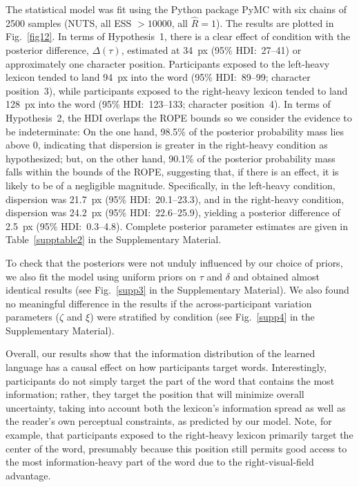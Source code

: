 \documentclass[doc,biblatex,floatsintext]{apa7}
\begin{document}
The statistical model was fit using the Python package PyMC with six chains of 2500 samples (NUTS, all ESS $> 10000$, all $\hat{R}=1$). The results are plotted in Fig.~\ref{fig12}. In terms of Hypothesis~1, there is a clear effect of condition with the posterior difference, $\Delta(\tau)$, estimated at 34~px (95\% HDI:~27--41) or approximately one character position. Participants exposed to the left-heavy lexicon tended to land 94~px into the word (95\% HDI:~89--99; character position~3), while participants exposed to the right-heavy lexicon tended to land 128~px into the word (95\% HDI:~123--133; character position~4). In terms of Hypothesis~2, the HDI overlaps the ROPE bounds so we consider the evidence to be indeterminate: On the one hand, 98.5\% of the posterior probability mass lies above 0, indicating that dispersion is greater in the right-heavy condition as hypothesized; but, on the other hand, 90.1\% of the posterior probability mass falls within the bounds of the ROPE, suggesting that, if there is an effect, it is likely to be of a negligible magnitude. Specifically, in the left-heavy condition, dispersion was 21.7~px (95\% HDI:~20.1--23.3), and in the right-heavy condition, dispersion was 24.2~px (95\% HDI:~22.6--25.9), yielding a posterior difference of 2.5~px (95\% HDI:~0.3--4.8). Complete posterior parameter estimates are given in Table~\ref{supptable2} in the Supplementary Material.

To check that the posteriors were not unduly influenced by our choice of priors, we also fit the model using uniform priors on $\tau$ and $\delta$ and obtained almost identical results (see Fig.~\ref{supp3} in the Supplementary Material). We also found no meaningful difference in the results if the across-participant variation parameters ($\zeta$ and $\xi$) were stratified by condition (see Fig.~\ref{supp4} in the Supplementary Material).

Overall, our results show that the information distribution of the learned language has a causal effect on how participants target words. Interestingly, participants do not simply target the part of the word that contains the most information; rather, they target the position that will minimize overall uncertainty, taking into account both the lexicon's information spread as well as the reader's own perceptual constraints, as predicted by our model. Note, for example, that participants exposed to the right-heavy lexicon primarily target the center of the word, presumably because this position still permits good access to the most information-heavy part of the word due to the right-visual-field advantage.
\end{document}
